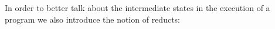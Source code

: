 

  

In order to better talk about the intermediate states in the execution
of a program we also introduce the notion of reducts:
